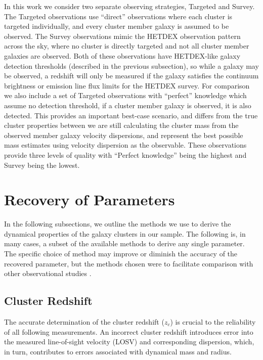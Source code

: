 \documentclass[fleqn,usenatbib]{mnras}
\begin{document}
In this work we consider two separate observing strategies, Targeted and Survey. The Targeted observations use ``direct'' observations where each cluster is targeted individually, and every cluster member galaxy is assumed to be observed. The Survey observations mimic the HETDEX observation pattern across the sky, where no cluster is directly targeted and not all cluster member galaxies are observed. Both of these observations have HETDEX-like galaxy detection thresholds (described in the previous subsection), so while a galaxy may be observed, a redshift will only be measured if the galaxy satisfies the continuum brightness or emission line flux limits for the HETDEX survey. For comparison we also include a set of Targeted observations with ``perfect'' knowledge which assume no detection threshold, if a cluster member galaxy is observed, it is also detected. This provides an important best-case scenario, and differs from the true cluster properties between we are still calculating the cluster mass from the observed member galaxy velocity dispersions, and represent the best possible mass estimates using velocity dispersion as the observable. These observations provide three levels of quality with ``Perfect knowledge'' being the highest and Survey being the lowest.

\section{Recovery of Parameters}\label{sec:recovery}
In the following subsections, we outline the methods we use to derive the dynamical properties of the galaxy clusters in our sample. The following is, in many cases, a subset of the available methods to derive any single parameter. The specific choice of method may improve or diminish the accuracy of the recovered parameter, but the methods chosen were to facilitate comparison with other observational studies . 

\subsection{Cluster Redshift}
The accurate determination of the cluster redshift ($z_c$) is crucial to the reliability of all following measurements. An incorrect cluster redshift introduces error into the measured line-of-sight velocity (LOSV) and corresponding dispersion, which, in turn, contributes to errors associated with dynamical mass and radius. 
\end{document}
